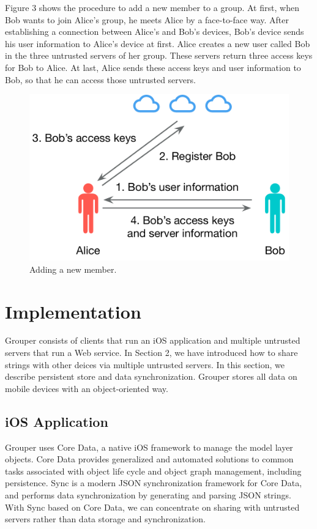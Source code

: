\documentclass[twocolumn,10pt]{article}
\begin{document}
Figure 3 shows the procedure to add a new member to a group. At first, when Bob wants to join Alice's group, he meets Alice by a face-to-face way. After establishing a connection between Alice's and Bob's devices, Bob's device sends his user information to Alice's device at first. Alice creates a new user called Bob in the three untrusted servers of her group. These servers return three access keys for Bob to Alice. At last, Alice sends these access keys and user information to Bob, so that he can access those untrusted servers.

\begin{figure}[t]
	\centering
	\includegraphics[scale=0.38]{add_member}
	\caption{Adding a new member.}
\end{figure}

\section{Implementation}
Grouper consists of clients that run an iOS application and multiple untrusted servers that run a Web service. In Section 2, we have introduced how to share strings with other deices via multiple untrusted servers. In this section, we describe persistent store and data synchronization. Grouper stores all data on mobile devices with an object-oriented way.

\subsection{iOS Application}
 Grouper uses Core Data\cite{coredata}, a native iOS framework to manage the model layer objects. Core Data provides generalized and automated solutions to common tasks associated with object life cycle and object graph management, including persistence. Sync\cite{sync} is a modern JSON synchronization framework for Core Data, and performs data synchronization by generating and parsing JSON strings. With Sync based on Core Data, we can concentrate on sharing with untrusted servers rather than data storage and synchronization.
\end{document}
